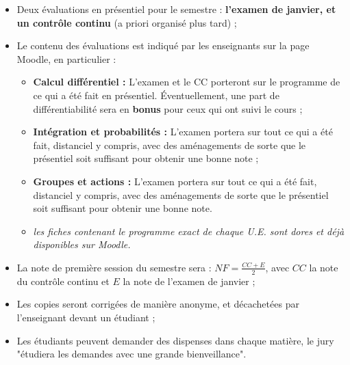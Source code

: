 \documentclass{article}
\begin{document}
\begin{itemize}
    \item Deux évaluations en présentiel pour le semestre : \textbf{l'examen de janvier, et un contrôle continu} (a priori organisé plus tard) ;
    \item Le contenu des évaluations est indiqué par les enseignants sur la page Moodle, en particulier :
    \begin{itemize}
        \item \textbf{Calcul différentiel :} L'examen et le CC porteront sur le programme de ce qui a été fait en présentiel. Éventuellement, une part de différentiabilité sera en \textbf{bonus} pour ceux qui ont suivi le cours ;
        \item \textbf{Intégration et probabilités :} L'examen portera sur tout ce qui a été fait, distanciel y compris, avec des aménagements de sorte que le présentiel soit suffisant pour obtenir une bonne note ;
        \item \textbf{Groupes et actions :} L'examen portera sur tout ce qui a été fait, distanciel y compris, avec des aménagements de sorte que le présentiel soit suffisant pour obtenir une bonne note.
        \item \textit{les fiches contenant le programme exact de chaque U.E. sont dores et déjà disponibles sur Moodle.}
    \end{itemize}
    \item La note de première session du semestre sera : $NF = \frac{CC + E}{2}$, avec $CC$ la note du contrôle continu et $E$ la note de l'examen de janvier ;
    \item Les copies seront corrigées de manière anonyme, et décachetées par l'enseignant devant un étudiant ;
    \item Les étudiants peuvent demander des dispenses dans chaque matière, le jury "étudiera les demandes avec une grande bienveillance".
\end{itemize}
\end{document}
